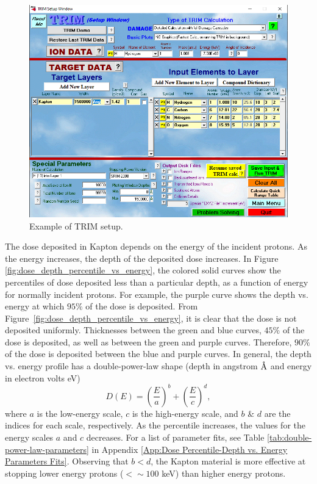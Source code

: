 \documentclass{hitec}
\newcommand{\angstrom}{\mbox{\normalfont\AA}}
\begin{document}
\begin{figure}[htbp!]
	\centering
	\includegraphics[width=1\textwidth]{../SRIM_setup.PNG}
	\caption{Example of TRIM setup.}\label{fig:SRIM_setup}
\end{figure}

The dose deposited in Kapton depends on the energy of the incident protons. As the energy increases, the depth of the deposited dose increases. In Figure \ref{fig:dose_depth_percentile_vs_energy}, the colored solid curves show the percentiles of dose deposited less than a particular depth, as a function of energy for normally incident protons. For example, the purple curve shows the depth vs. energy at which $95\%$ of the dose is deposited. From Figure~\ref{fig:dose_depth_percentile_vs_energy}, it is clear that the dose is not deposited  uniformly. Thicknesses between the green and blue curves, $45\%$ of the dose is deposited, as well as between the green and purple curves. Therefore, $90\%$ of the dose is deposited between the blue and purple curves. In general, the depth vs. energy profile has a double-power-law shape (depth in angstrom $\angstrom$ and energy in electron volts eV)
\begin{equation}\label{eq:double-power-law}
	D(E) = \left(\frac{E}{a}\right)^b + \left(\frac{E}{c}\right)^d,
\end{equation}
where $a$ is the low-energy scale, $c$ is the high-energy scale, and $b$ \& $d$ are the indices for each scale, respectively. As the percentile increases, the values for the energy scales $a$ and $c$ decreases. For a list of parameter fits, see Table \ref{tab:double-power-law-parameters} in Appendix \ref{App:Dose Percentile-Depth vs. Energy Parameters Fits}. Observing that $b < d$, the Kapton material is more effective at stopping lower energy protons ($ < \sim 100$ keV) than higher energy protons.
\end{document}
